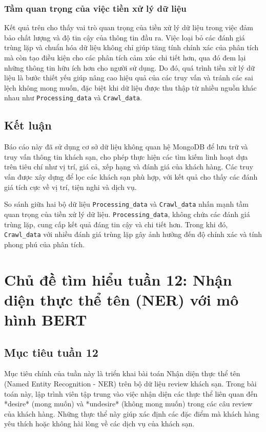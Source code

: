 \subsubsection{Tầm quan trọng của việc tiền xử lý dữ liệu}

Kết quả trên cho thấy vai trò quan trọng của tiền xử lý dữ liệu trong việc đảm bảo chất lượng và độ tin cậy của thông tin đầu ra. Việc loại bỏ các đánh giá trùng lặp và chuẩn hóa dữ liệu không chỉ giúp tăng tính chính xác của phân tích mà còn tạo điều kiện cho các phân tích cảm xúc chi tiết hơn, qua đó đem lại những thông tin hữu ích hơn cho người sử dụng. Do đó, quá trình tiền xử lý dữ liệu là bước thiết yếu giúp nâng cao hiệu quả của các truy vấn và tránh các sai lệch không mong muốn, đặc biệt khi dữ liệu được thu thập từ nhiều nguồn khác nhau như \texttt{Processing\_data} và \texttt{Crawl\_data}.


\subsection{Kết luận} 
Báo cáo này đã sử dụng cơ sở dữ liệu không quan hệ MongoDB để lưu trữ và truy vấn thông tin khách sạn, cho phép thực hiện các tìm kiếm linh hoạt dựa trên tiêu chí như vị trí, giá cả, xếp hạng và đánh giá của khách hàng. Các truy vấn được xây dựng để lọc các khách sạn phù hợp, với kết quả cho thấy các đánh giá tích cực về vị trí, tiện nghi và dịch vụ.

So sánh giữa hai bộ dữ liệu \texttt{Processing\_data} và \texttt{Crawl\_data} nhấn mạnh tầm quan trọng của tiền xử lý dữ liệu. \texttt{Processing\_data}, không chứa các đánh giá trùng lặp, cung cấp kết quả đáng tin cậy và chi tiết hơn. Trong khi đó, \texttt{Crawl\_data} với nhiều đánh giá trùng lặp gây ảnh hưởng đến độ chính xác và tính phong phú của phân tích.

\section{Chủ đề tìm hiểu tuần 12: Nhận diện thực thể tên (NER) với mô hình BERT}

\subsection{Mục tiêu tuần 12}
Mục tiêu chính của tuần này là triển khai bài toán Nhận diện thực thể tên (Named Entity Recognition - NER) trên bộ dữ liệu review khách sạn. Trong bài toán này, lập trình viên tập trung vào việc nhận diện các thực thể liên quan đến *desire* (mong muốn) và *undesire* (không mong muốn) trong các câu review của khách hàng. Những thực thể này giúp xác định các đặc điểm mà khách hàng yêu thích hoặc không hài lòng về các dịch vụ của khách sạn.

